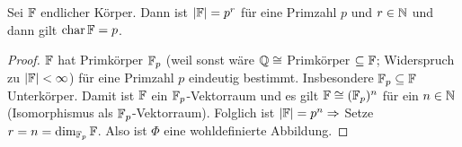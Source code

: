 \documentclass[12pt,a4paper]{scrartcl}
\begin{document}
\begin{lem}
	Sei $\mathbb F$ endlicher Körper. Dann ist $|\mathbb F| = p^r$ für eine Primzahl $p$ und $r\in\mathbb N$ und dann gilt $\operatorname{char} \mathbb F = p$.
\end{lem}

\begin{proof}
	$\mathbb F$ hat Primkörper $\mathbb F_p$ (weil sonst wäre $\mathbb Q\cong$ Primkörper $\subseteq \mathbb F$; Widerspruch zu $|\mathbb F|<\infty$) für eine Primzahl $p$ eindeutig bestimmt. Insbesondere $\mathbb F_p\subseteq \mathbb F$ Unterkörper. Damit ist $\mathbb F$ ein $\mathbb F_p$-Vektorraum und es gilt $\mathbb F\cong (\mathbb F_p)^n$ für ein $n\in\mathbb N$ (Isomorphismus als $\mathbb F_p$-Vektorraum). Folglich ist $|\mathbb F| = p^n\Rightarrow$ Setze $r = n = \dim_{\mathbb F_p}\mathbb F$. Also ist $\Phi$ eine wohldefinierte Abbildung.
\end{proof}
\end{document}
